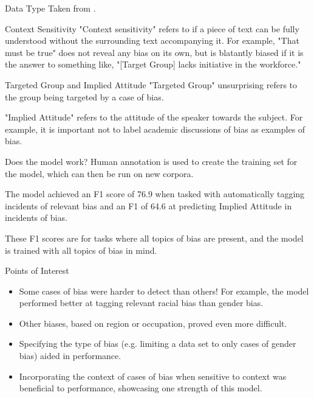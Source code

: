 \documentclass[10pt]{beamer}
\begin{document}
\begin{frame}{Data Type}
Taken from \cite{bias}.
\end{frame}

\begin{frame}{Context Sensitivity}
"Context sensitivity" refers to if a piece of text can be fully understood without the surrounding text accompanying it. For example, "That must be true" does not reveal any bias on its own, but is blatantly biased if it is the answer to something like, "[Target Group] lacks initiative in the workforce."
\end{frame}

\begin{frame}{Targeted Group and Implied Attitude}
"Targeted Group" unsurprising refers to the group being targeted by a case of bias.

"Implied Attitude" refers to the attitude of the speaker towards the subject. For example, it is important not to label academic discussions of bias as examples of bias.
\end{frame}

\begin{frame}{Does the model work?}
Human annotation is used to create the training set for the model, which can then be run on new corpora.

The model achieved an F1 score of 76.9 when tasked with automatically tagging incidents of relevant bias and an F1 of 64.6 at predicting Implied Attitude in incidents of bias.

These F1 scores are for tasks where all topics of bias are present, and the model is trained with all topics of bias in mind.
\end{frame}

\begin{frame}
Points of Interest
\begin{itemize}
    \item Some cases of bias were harder to detect than others! For example, the model performed better at tagging relevant racial bias than gender bias.
    \item Other biases, based on region or occupation, proved even more difficult.
    \item Specifying the type of bias (e.g. limiting a data set to only cases of gender bias) aided in performance. 
    \item Incorporating the context of cases of bias when sensitive to context was beneficial to performance, showcasing one strength of this model.
\end{itemize}

\end{frame}
\end{document}
